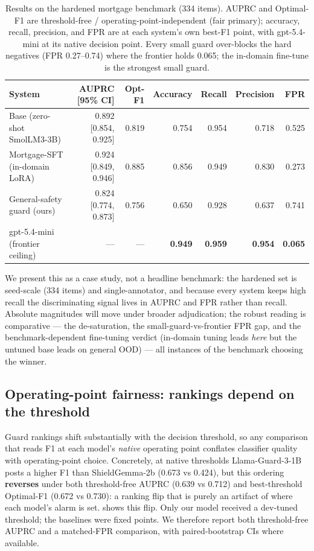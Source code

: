 \documentclass[sigconf,nonacm]{acmart}
\begin{document}
\begin{table}[t]
\centering
\small
\caption{Results on the hardened mortgage benchmark (334 items). AUPRC and Optimal-F1 are threshold-free / operating-point-independent (fair primary); accuracy, recall, precision, and FPR are at each system's own best-F1 point, with gpt-5.4-mini at its native decision point. Every small guard over-blocks the hard negatives (FPR 0.27--0.74) where the frontier holds 0.065; the in-domain fine-tune is the strongest small guard.}
\label{tab:mortgage-casestudy}
\begin{tabular}{lrrrrrr}
\toprule
System & AUPRC [95\% CI] & Opt-F1 & Accuracy & Recall & Precision & FPR \\
\midrule
Base (zero-shot SmolLM3-3B) & 0.892 [0.854, 0.925] & 0.819 & 0.754 & 0.954 & 0.718 & 0.525 \\
Mortgage-SFT (in-domain LoRA) & 0.924 [0.849, 0.946] & 0.885 & 0.856 & 0.949 & 0.830 & 0.273 \\
General-safety guard (ours) & 0.824 [0.774, 0.873] & 0.756 & 0.650 & 0.928 & 0.637 & 0.741 \\
gpt-5.4-mini (frontier ceiling) & --- & --- & \textbf{0.949} & \textbf{0.959} & \textbf{0.954} & \textbf{0.065} \\
\bottomrule
\end{tabular}
\end{table}

We present this as a case study, not a headline benchmark: the hardened set is seed-scale (334 items) and single-annotator, and because every system keeps high recall the discriminating signal lives in AUPRC and FPR rather than recall. Absolute magnitudes will move under broader adjudication; the robust reading is comparative --- the de-saturation, the small-guard-vs-frontier FPR gap, and the benchmark-dependent fine-tuning verdict (in-domain tuning leads \emph{here} but the untuned base leads on general OOD) --- all instances of the benchmark choosing the winner.

\subsection{Operating-point fairness: rankings depend on the threshold}
\label{sec:operating-point-fairness}

Guard rankings shift substantially with the decision threshold, so any comparison that reads F1 at each model's \emph{native} operating point conflates classifier quality with operating-point choice. Concretely, at native thresholds Llama-Guard-3-1B posts a higher F1 than ShieldGemma-2b (0.673 vs 0.424), but this ordering \textbf{reverses} under both threshold-free AUPRC (0.639 vs 0.712) and best-threshold Optimal-F1 (0.672 vs 0.730): a ranking flip that is purely an artifact of where each model's alarm is set.  shows this flip. Only our model received a dev-tuned threshold; the baselines were fixed points. We therefore report both threshold-free AUPRC and a matched-FPR comparison, with paired-bootstrap CIs where available.
\end{document}
